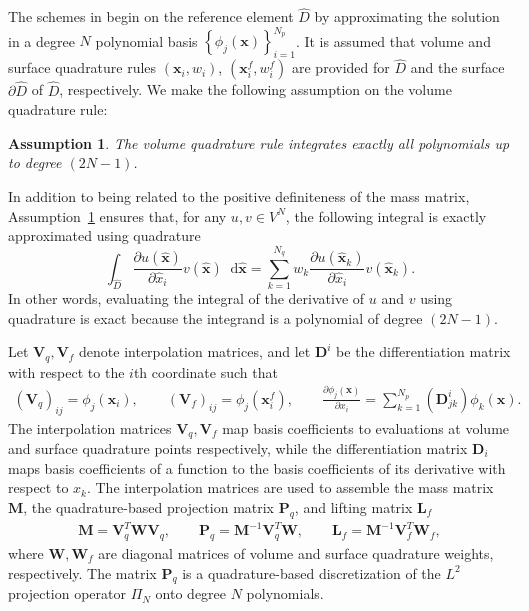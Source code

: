 \documentclass[review]{siamart0216}
\theoremstyle{assumption}
\newtheorem{assumption}{Assumption}
\renewcommand{\hat}[1]{\widehat{#1}}
\newcommand{\pd}[2]{\frac{\partial#1}{\partial#2}}
\newcommand{\LRp}[1]{\left( #1 \right)}
\newcommand{\LRc}[1]{\left\{ #1 \right\}}
\newcommand{\note}[1]{{\color{blue}{#1}}}
\newcommand*\diff[1]{\mathop{}\!{\mathrm{d}#1}}
\begin{document}
The schemes in \cite{chan2017discretely} begin on the reference element $\hat{D}$ by approximating the solution in a degree $N$ polynomial basis $\LRc{\phi_j({\bm{x}})}_{i=1}^{N_p}$.  It is assumed that volume and surface quadrature rules $({\bm{x}}_i, w_i)$, $\LRp{{\bm{x}}^f_i,w^f_i}$ are provided for $\hat{D}$ and the surface $\partial \hat{D}$ of $\hat{D}$, respectively.  We make the following assumption on the volume quadrature rule:
\begin{assumption}
The volume quadrature rule integrates exactly all polynomials up to degree $(2N-1)$.
\label{ass:quad}
\end{assumption}
In addition to being related to the positive definiteness of the mass matrix, Assumption~\ref{ass:quad} ensures that, for any $u,v \in V^N$, the following integral is exactly approximated using quadrature
\[
\int_{\hat{D}} \pd{u(\hat{\bm{x}})}{\hat{x}_i} v(\hat{\bm{x}})\diff{\hat{\bm{x}}} = \sum_{k=1}^{N_q} w_k \pd{u(\hat{\bm{x}}_k)}{\hat{x}_i} v(\hat{\bm{x}}_k).  
\]
In other words, evaluating the integral of the derivative of $u$ and $v$ using quadrature is exact because the integrand is a polynomial of degree $(2N-1)$.  

\note{TODO: Standardize hat notation for operators/normals: can refer to operators on reference element and do $k$ superscript for physical elements, or do hats on reference element.}

Let $\bm{V}_q,\bm{V}_f$ denote interpolation matrices, and let $\bm{D}^i$ be the differentiation matrix with respect to the $i$th coordinate such that
\begin{gather}
\LRp{\bm{V}_q}_{ij} = \phi_j(\bm{x}_i), \qquad \LRp{\bm{V}_f}_{ij} = \phi_j(\bm{x}^f_i), \qquad \pd{\phi_j(\bm{x})}{x_i} = \sum_{k=1}^{N_p} \LRp{\bm{D}^i_{jk}} \phi_k(\bm{x}).
\end{gather}
The interpolation matrices $\bm{V}_q,\bm{V}_f$ map basis coefficients to evaluations at volume and surface quadrature points respectively, while the differentiation matrix ${\bm{D}}_i$ maps basis coefficients of a function to the basis coefficients of its derivative with respect to $x_k$.  The interpolation matrices are used to assemble the mass matrix $\bm{M}$, the quadrature-based projection matrix $\bm{P}_q$, and lifting matrix $\bm{L}_f$
\begin{gather}
\bm{M} = \bm{V}_q^T\bm{W}\bm{V}_q, \qquad \bm{P}_q = \bm{M}^{-1}\bm{V}_q^T\bm{W}, \qquad \bm{L}_f = \bm{M}^{-1}\bm{V}_f^T\bm{W}_f,
\end{gather}
where $\bm{W}, \bm{W}_f$ are diagonal matrices of volume and surface quadrature weights, respectively.  The matrix $\bm{P}_q$ is a quadrature-based discretization of the $L^2$ projection operator $\Pi_N$ onto degree $N$ polynomials.
\end{document}

